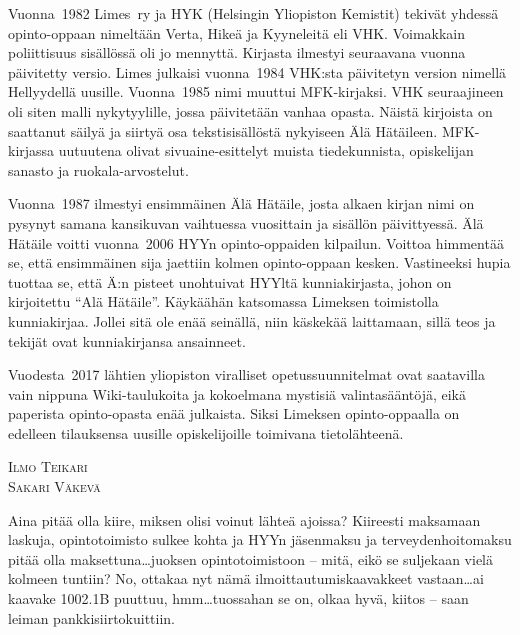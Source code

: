 \documentclass[a5paper, 8pt, twocolumn]{book} %
\numberwithin{equation}{section}
\begin{document}
Vuonna~1982 Limes~ry ja HYK (Helsingin
Yliopiston Kemistit) tekivät yhdessä
opinto-oppaan nimeltään Verta, Hikeä ja
Kyyneleitä eli VHK. Voimakkain poliittisuus
sisällössä oli jo mennyttä. Kirjasta ilmestyi seuraavana vuonna päivitetty versio.
Limes julkaisi vuonna~1984 VHK:sta
päivitetyn version nimellä Hellyydellä
uusille. Vuonna~1985 nimi muuttui MFK-kirjaksi.
VHK seuraajineen oli siten malli
nykytyylille, jossa päivitetään vanhaa
opasta. Näistä kirjoista on saattanut säilyä
ja siirtyä osa teksti\-sisällöstä nykyiseen Älä
Hätäileen. MFK-kirjassa uutuutena olivat
sivuaine-esittelyt muista tiede\-kunnista,
opiskelijan sanasto ja ruokala-arvostelut.

Vuonna~1987 ilmestyi ensimmäinen Älä
Hätäile, josta alkaen kirjan nimi on pysynyt
samana kansikuvan vaihtuessa vuosittain
ja sisällön päivittyessä. Älä Hätäile voitti
vuonna~2006 HYYn opinto-oppaiden kilpailun.
Voittoa himmentää se, että ensimmäinen
sija jaettiin kolmen opinto-oppaan
kesken. Vastineeksi hupia tuottaa se, että
Ä:n pisteet unohtuivat HYYltä kunnia\-kirjasta,
johon on kirjoitettu ``Alä Hätäile''.
Käykäähän katsomassa Limeksen toimistolla
kunniakirjaa. Jollei sitä ole enää seinällä,
niin käskekää laittamaan, sillä teos ja
tekijät ovat kunniakirjansa ansainneet.

Vuodesta~2017 lähtien yliopiston viralliset opetussuunnitelmat ovat saatavilla vain nippuna Wiki-taulukoita ja kokoelmana mystisiä valintasääntöjä, eikä paperista opinto-opasta enää julkaista. Siksi Limeksen opinto-oppaalla on edelleen tilauksensa uusille opiskelijoille
toimivana tieto\-lähteenä. 

\vspace{0.5cm}
\noindent\textsc{Ilmo Teikari}\\
\noindent\textsc{Sakari Väkevä}

Aina pitää olla kiire, miksen olisi voinut
lähteä ajoissa? Kiireesti maksamaan
laskuja, opinto\-toimisto sulkee kohta ja
HYYn jäsenmaksu ja terveyden\-hoito\-maksu
pitää olla maksettuna\dots juoksen opinto\-toimistoon
-- mitä, eikö se suljekaan vielä
kolmeen tuntiin? No, ottakaa nyt nämä
ilmoit\-tautumis\-kaavakkeet
vastaan\dots ai kaavake
1002.1B puuttuu, hmm\dots tuossahan
se on, olkaa hyvä, kiitos -- saan leiman
pankki\-siirto\-kuittiin.
\end{document}
